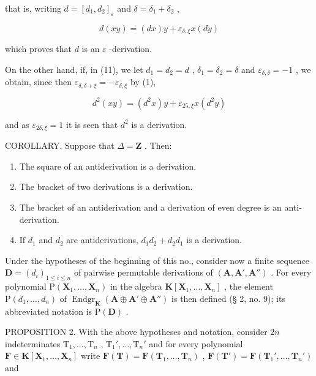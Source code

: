 that is, writing \(d = [d_1, d_2]_{\varepsilon}\) and \(\delta = \delta_1 + \delta_2\) ,

\[
d (x y) = (d x) y + \varepsilon_ {\delta , \xi} x (d y)
\]

which proves that \(d\) is an \(\varepsilon\) -derivation.

On the other hand, if, in (11), we let \(d_1 = d_2 = d\) , \(\delta_1 = \delta_2 = \delta\) and \(\varepsilon_{\delta,\delta} = -1\) , we obtain, since then \(\varepsilon_{\delta,\delta + \xi} = -\varepsilon_{\delta,\xi}\) by (1),

\[
d ^ {2} (x y) = \left(d ^ {2} x\right) y + \varepsilon_ {2 5, \xi} x \left(d ^ {2} y\right)
\]

and as \(\varepsilon_{2\delta, \xi} = 1\) it is seen that \(d^2\) is a derivation.

COROLLARY. Suppose that \(\Delta = \mathbf{Z}\) . Then:

\begin{enumerate}
\def\labelenumi{(\roman{enumi})}
\item
  The square of an antiderivation is a derivation.
\item
  The bracket of two derivations is a derivation.
\item
  The bracket of an antiderivation and a derivation of even degree is an anti-derivation.
\item
  If \(d_1\) and \(d_2\) are antiderivations, \(d_1d_2 + d_2d_1\) is a derivation.
\end{enumerate}

Under the hypotheses of the beginning of this no., consider now a finite sequence \(\mathbf{D} = (d_i)_{1 \leqslant i \leqslant n}\) of pairwise permutable derivations of \((\mathbf{A}, \mathbf{A}', \mathbf{A}'')\) . For every polynomial \(\mathrm{P}(\mathbf{X}_1, \ldots, \mathbf{X}_n)\) in the algebra \(\mathbf{K}[\mathbf{X}_1, \ldots, \mathbf{X}_n]\) , the element \(\mathrm{P}(d_1, \ldots, d_n)\) of \(\operatorname{Endgr}_{\mathbf{K}}(\mathbf{A} \oplus \mathbf{A}' \oplus \mathbf{A}'')\) is then defined (§ 2, no. 9); its abbreviated notation is \(\mathrm{P}(\mathbf{D})\) .

PROPOSITION 2. With the above hypotheses and notation, consider \(2n\) indeterminates \(\mathrm{T}_1, \ldots, \mathrm{T}_n\) , \(\mathrm{T}_1', \ldots, \mathrm{T}_n'\) and for every polynomial \(\mathbf{F} \in \mathbf{K}[\mathbf{X}_1, \ldots, \mathbf{X}_n]\) write \(\mathbf{F}(\mathbf{T}) = \mathbf{F}(\mathbf{T}_1, \ldots, \mathbf{T}_n)\) , \(\mathbf{F}(\mathbf{T}') = \mathbf{F}(\mathbf{T}_1', \ldots, \mathbf{T}_n')\) and

